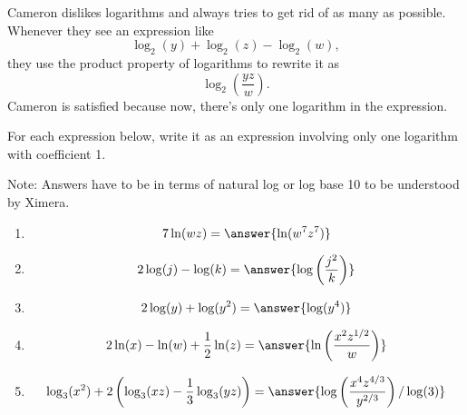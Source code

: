 \documentclass{ximera}
\author{Kenneth Berglund}
\begin{document}
Cameron dislikes logarithms and always tries to get rid of as many as possible. Whenever they see an expression like 
$$
\log_2(y) + \log_2(z) - \log_2(w),
$$
they use the product property of logarithms to rewrite it as 
$$
\log_2\left(\frac{yz}{w}\right). 
$$
Cameron is satisfied because now, there's only one logarithm in the expression.

\begin{exercise}
For each expression below, write it as an expression involving only one logarithm with coefficient 1.  

Note: Answers have to be in terms of natural log or log base 10 to be understood by Ximera.
\begin{enumerate}
\item 
$$
7\ln(wz) = \answer{\ln(w^7z^7)}
$$

\item 
$$
2\log(j) - \log(k) = \answer{\log\left(\frac{j^2}{k}\right)}
$$

\item
$$
2\log(y) + \log(y^2) = \answer{\log(y^4)}
$$

\item 
$$
2\ln(x) - \ln(w) + \frac{1}{2}\ln(z) = \answer{\ln\left(\frac{x^2z^{1/2}}{w}\right)}
$$



\item 
$$
\log_3(x^2) + 2\left(\log_3(xz) - \frac{1}{3}\log_3(yz)\right) = \answer{\log\left(\frac{x^4z^{4/3}}{y^{2/3}}\right)/\log(3)}
$$


\end{enumerate}


\end{exercise}
\end{document}
